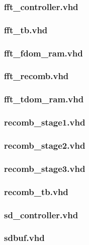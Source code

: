 \documentclass{article}
\begin{document}
	\subsubsection{fft\_controller.vhd}
	
	\subsubsection{fft\_tb.vhd}
	
	\subsubsection{fft\_fdom\_ram.vhd}
	
	\subsubsection{fft\_recomb.vhd}
	
	\subsubsection{fft\_tdom\_ram.vhd}
	
	\subsubsection{recomb\_stage1.vhd}
	
	\subsubsection{recomb\_stage2.vhd}
	
	\subsubsection{recomb\_stage3.vhd}
	
	\subsubsection{recomb\_tb.vhd}
	
	\subsubsection{sd\_controller.vhd}
	
	\subsubsection{sdbuf.vhd}
	
\end{document}

